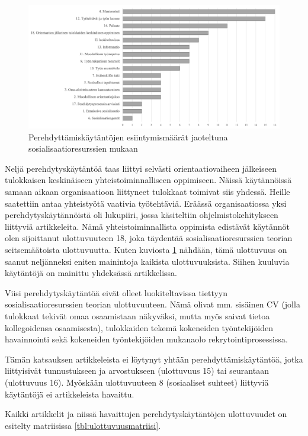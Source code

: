 \documentclass[utf8]{gradu3}
\begin{document}
\begin{figure}[h]
    \centering
    \includegraphics[width=\textwidth]{media/ulottuvuudet.png}
    \caption{Perehdyttämiskäytäntöjen esiintymismäärät jaoteltuna sosialisaatioresurssien \parencite{saks-gruman-2012} mukaan}
    \label{kuvio:ulottuvuudet}
\end{figure}

Neljä perehdytyskäytäntöä taas liittyi selvästi orientaatiovaiheen jälkeiseen tulokkaisen keskinäiseen yhteistoiminnalliseen oppimiseen. Näissä käytännöissä samaan aikaan organisaatioon liittyneet tulokkaat toimivat siis yhdessä. Heille saatettiin antaa yhteistyötä vaativia työtehtäviä. Eräässä organisaatiossa yksi perehdytyskäytännöistä oli lukupiiri, jossa käsiteltiin ohjelmistokehitykseen liittyviä artikkeleita. Nämä yhteistoiminnallista oppimista edistävät käytännöt olen sijoittanut ulottuvuuteen 18, joka täydentää sosialisaatioresurssien teorian seitsemäätoista ulottuvuutta. Kuten kuviosta \ref{kuvio:ulottuvuudet} nähdään, tämä ulottuvuus on saanut neljänneksi eniten mainintoja kaikista ulottuvuuksista. Siihen kuuluvia käytäntöjä on mainittu yhdeksässä artikkelissa. 

Viisi perehdytyskäytäntöä eivät olleet luokiteltavissa tiettyyn sosialisaatioresurssien teorian ulottuvuuteen. Nämä olivat mm. sisäinen CV (jolla tulokkaat tekivät omaa osaamistaan näkyväksi, mutta myös saivat tietoa kollegoidensa osaamisesta), tulokkaiden tekemä kokeneiden työntekijöiden havainnointi sekä kokeneiden työntekijöiden mukanaolo rekrytointiprosessissa. 

Tämän katsauksen artikkeleista ei löytynyt yhtään perehdyttämiskäytäntöä, jotka liittyisivät tunnustukseen ja arvostukseen (ulottuvuus 15) tai seurantaan (ulottuvuus 16). Myöskään ulottuvuuteen 8 (sosiaaliset suhteet) liittyviä käytäntöjä ei artikkeleista havaittu.

Kaikki artikkelit ja niissä havaittujen perehdytyskäytäntöjen ulottuvuudet on esitelty matriisissa \ref{tbl:ulottuvuusmatriisi}.
\end{document}

